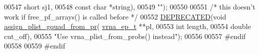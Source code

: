 \begin{DoxyCode}
00547                                     \textcolor{keywordtype}{short} sj1,
00548                                     \textcolor{keyword}{const} \textcolor{keywordtype}{char} *\textcolor{keywordtype}{string}),
00549 \textcolor{stringliteral}{""});
00550 
00551 \textcolor{comment}{/* this doesn't work if free\_pf\_arrays() is called before */}
00552 \mbox{\hyperlink{part__func_8h_aab347a3c03fbe8e7319551b9fa0cce4a}{DEPRECATED}}(\textcolor{keywordtype}{void} \mbox{\hyperlink{part__func_8h_adfdc1276accdffec098fb372cca28486}{assign\_plist\_gquad\_from\_pr}}(
      \mbox{\hyperlink{group__struct__utils_structvrna__elem__prob__s}{vrna\_ep\_t}} **pl,
00553                                 \textcolor{keywordtype}{int} length,
00554                                 \textcolor{keywordtype}{double} cut\_off),
00555 \textcolor{stringliteral}{"Use vrna\_plist\_from\_probs() instead"});
00556 
00557 \textcolor{preprocessor}{#endif}
00558 
00559 \textcolor{preprocessor}{#endif}
\end{DoxyCode}
